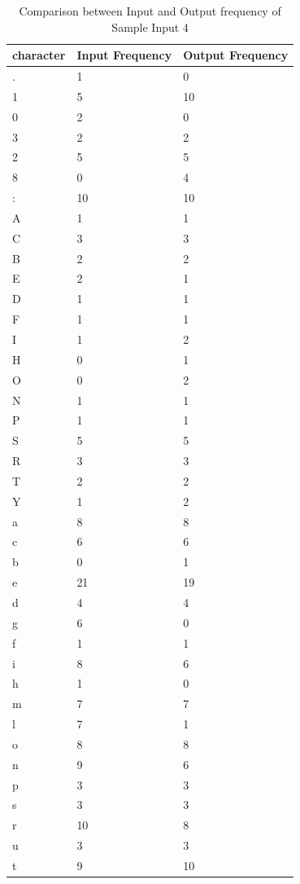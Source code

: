 \begin{table}[H]
\centering
\begin{tabular}{|p{2cm}|p{2cm}|p{2cm}|}
\hline
character & Input Frequency & Output Frequency \\
\hline
. & 1 & 0\\
\hline
1 & 5 & 10\\
\hline
0 & 2 & 0\\
\hline
3 & 2 & 2\\
\hline
2 & 5 & 5\\
\hline
8 & 0 & 4\\
\hline
: & 10 & 10\\
\hline
A & 1 & 1\\
\hline
C & 3 & 3\\
\hline
B & 2 & 2\\
\hline
E & 2 & 1\\
\hline
D & 1 & 1\\
\hline
F & 1 & 1\\
\hline
I & 1 & 2\\
\hline
H & 0 & 1\\
\hline
O & 0 & 2\\
\hline
N & 1 & 1\\
\hline
P & 1 & 1\\
\hline
S & 5 & 5\\
\hline
R & 3 & 3\\
\hline
T & 2 & 2\\
\hline
Y & 1 & 2\\
\hline
a & 8 & 8\\
\hline
c & 6 & 6\\
\hline
b & 0 & 1\\
\hline
e & 21 & 19\\
\hline
d & 4 & 4\\
\hline
g & 6 & 0\\
\hline
f & 1 & 1\\
\hline
i & 8 & 6\\
\hline
h & 1 & 0\\
\hline
m & 7 & 7\\
\hline
l & 7 & 1\\
\hline
o & 8 & 8\\
\hline
n & 9 & 6\\
\hline
p & 3 & 3\\
\hline
s & 3 & 3\\
\hline
r & 10 & 8\\
\hline
u & 3 & 3\\
\hline
t & 9 & 10\\
\hline
\end{tabular}
\caption {Comparison between Input and Output frequency of Sample Input 4}
\label {tab:Table4}
\end{table}


